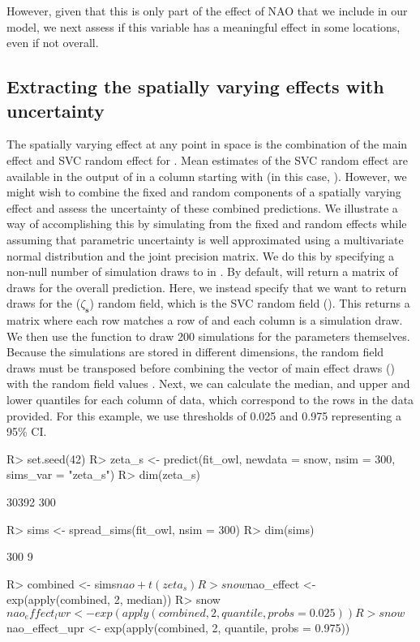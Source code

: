 \documentclass[article]{jss}\usepackage[]{graphicx}\usepackage[dvipsnames]{xcolor}
\newcommand{\fct}[1]{\code{#1()}}
\begin{document}
However, given that this is only part of the effect of NAO that we include in our model, we next assess if this variable has a meaningful effect in some locations, even if not overall.

\subsection{Extracting the spatially varying effects with uncertainty}

The spatially varying effect at any point in space is the combination of the main effect and SVC random effect for .
Mean estimates of the SVC random effect are available in the output of \fct{predict.sdmTMB} in a column starting with  (in this case, ).
However, we might wish to combine the fixed and random components of a spatially varying effect and assess the uncertainty of these combined predictions.
We illustrate a way of accomplishing this by simulating from the fixed and random effects while assuming that parametric uncertainty is well approximated using a multivariate normal distribution and the joint precision matrix.
We do this by specifying a non-null number of simulation draws to  in \fct{predict.sdmTMB}.
By default,  will return a matrix of draws for the overall prediction.
Here, we instead specify that we want to return draws for the  ($\zeta_{\bm{s}}$) random field, which is the SVC random field ().
This returns a matrix where each row matches a row of  and each column is a simulation draw.
We then use the function \fct{spread\_sims} to draw 200 simulations for the parameters themselves.
Because the simulations are stored in different dimensions, the random field draws must be transposed  before combining the vector of main effect draws () with the random field values .
Next, we can calculate the median, and upper and lower quantiles for each column of data, which correspond to the rows in the data provided.
For this example, we use thresholds of 0.025 and 0.975 representing a 95\% CI.



\begin{Schunk}
\begin{Sinput}
R> set.seed(42)
R> zeta_s <- predict(fit_owl, newdata = snow, nsim = 300, sims_var = "zeta_s")
R> dim(zeta_s)
\end{Sinput}
\begin{Soutput}
[1] 30392   300
\end{Soutput}
\begin{Sinput}
R> sims <- spread_sims(fit_owl, nsim = 300)
R> dim(sims)
\end{Sinput}
\begin{Soutput}
[1] 300   9
\end{Soutput}
\begin{Sinput}
R> combined <- sims$nao + t(zeta_s)
R> snow$nao_effect <- exp(apply(combined, 2, median))
R> snow$nao_effect_lwr <- exp(apply(combined, 2, quantile, probs = 0.025))
R> snow$nao_effect_upr <- exp(apply(combined, 2, quantile, probs = 0.975))
\end{Sinput}
\end{Schunk}
\end{document}
